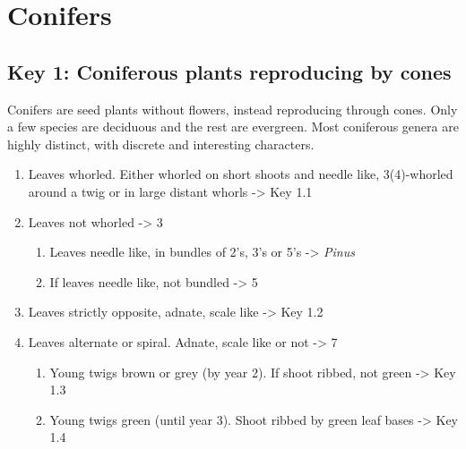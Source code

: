 \documentclass[openany]{book}
\providecommand{\tightlist}{%
  \setlength{\itemsep}{0pt}\setlength{\parskip}{0pt}}
\begin{document}
\hypertarget{conifers}{%
\chapter*{Conifers}\label{conifers}}

\hypertarget{key-1-coniferous-plants-reproducing-by-cones}{%
\section*{Key 1: Coniferous plants reproducing by
cones}\label{key-1-coniferous-plants-reproducing-by-cones}}

Conifers are seed plants without flowers, instead reproducing through
cones. Only a few species are deciduous and the rest are evergreen. Most
coniferous genera are highly distinct, with discrete and interesting
characters.

\begin{enumerate}
\def\labelenumi{\arabic{enumi}.}
\tightlist
\item
  Leaves whorled. Either whorled on short shoots and needle like,
  3(4)-whorled around a twig or in large distant whorls -\textgreater{}
  Key 1.1
\item
  Leaves not whorled -\textgreater{} 3

  \begin{enumerate}
  \def\labelenumii{\arabic{enumii}.}
  \setcounter{enumii}{2}
  \tightlist
  \item
    Leaves needle like, in bundles of 2's, 3's or 5's -\textgreater{}
    \emph{Pinus}
  \item
    If leaves needle like, not bundled -\textgreater{} 5
  \end{enumerate}
\item
  Leaves strictly opposite, adnate, scale like -\textgreater{} Key 1.2
\item
  Leaves alternate or spiral. Adnate, scale like or not -\textgreater{}
  7

  \begin{enumerate}
  \def\labelenumii{\arabic{enumii}.}
  \setcounter{enumii}{6}
  \tightlist
  \item
    Young twigs brown or grey (by year 2). If shoot ribbed, not green
    -\textgreater{} Key 1.3
  \item
    Young twigs green (until year 3). Shoot ribbed by green leaf bases
    -\textgreater{} Key 1.4
  \end{enumerate}
\end{enumerate}
\end{document}
